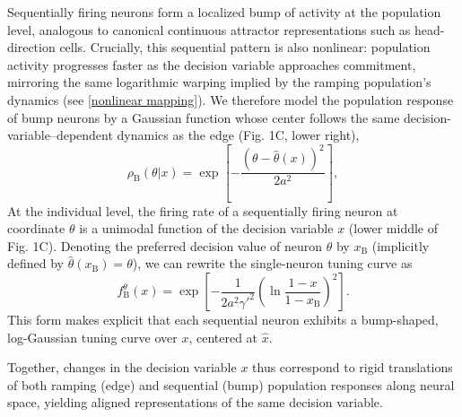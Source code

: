 \documentclass{article}
\newcommand{\rhoB}{\rho_{\text{B}}}
\newcommand{\thetah}{\hat{\theta}}
\newcommand{\gammaSig}{\gamma'}
\begin{document}
Sequentially firing neurons form a localized bump of activity at the population level, analogous to canonical continuous attractor representations such as head-direction cells. Crucially, this sequential pattern is also nonlinear: population activity progresses faster as the decision variable approaches commitment, mirroring the same logarithmic warping implied by the ramping population’s dynamics (see \eqref{nonlinear mapping}). We therefore model the population response of bump neurons by a Gaussian function whose center follows the same decision-variable–dependent dynamics as the edge (Fig. 1C, lower right),
\begin{equation}
\rhoB(\theta|x)
= \exp\!\left[-\frac{(\theta-\hat{\theta}(x))^2}{2a^2}\right], \label{rhoB}
\end{equation}
At the individual level, the firing rate of a sequentially firing neuron at coordinate $\theta$ is a unimodal function of the decision variable $x$ (lower middle of Fig. 1C).  Denoting the preferred decision value of neuron $\theta$ by $x_{\mathrm{B}}$ (implicitly defined by $\thetah(x_{\mathrm{B}})=\theta$), we can rewrite the single-neuron tuning curve as
\begin{equation}
    f_{\text{B}}^{\theta}(x)
    =
    \exp\!\left[
    -\frac{1}{2a^2\gammaSig^2}
    \left(
    \ln \frac{1-x}{1-x_{\mathrm{B}}}
    \right)^2
    \right].
\end{equation}
This form makes explicit that each sequential neuron exhibits a bump-shaped, log-Gaussian tuning curve over $x$, centered at $\hat{x}$.

Together, changes in the decision variable $x$ thus correspond to rigid translations of both ramping (edge) and sequential (bump) population responses along neural space, yielding aligned representations of the same decision variable.
\end{document}

